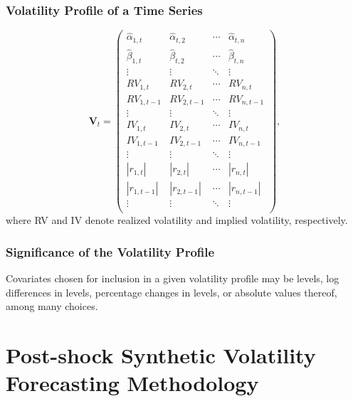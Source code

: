 \documentclass{beamer}
\theoremstyle{definition}
\begin{document}
\begin{frame}
\frametitle{Volatility Profile of a Time Series}
\fontsize{2}{7}

\begin{equation*}
    \textbf{V}_{t} = 
    \begin{pmatrix}
    \hat\alpha_{1,t} & \hat\alpha_{t,2}  & \cdots & \hat\alpha_{t,n}  \\
    \hat\beta_{1,t} & \hat\beta_{t,2}  & \cdots & \hat\beta_{t,n}  \\
    \vdots  & \vdots  & \ddots & \vdots  \\
    RV_{1,t} & RV_{2,t}  & \cdots & RV_{n,t}  \\
    RV_{1,t-1}  & RV_{2,t-1}  & \cdots & RV_{n,t-1}  \\
    \vdots  & \vdots  & \ddots & \vdots  \\
    IV_{1,t} & IV_{2,t} & \cdots & IV_{n,t} \\
    IV_{1,t-1}  & IV_{2,t-1}  & \cdots & IV_{n,t-1} \\
    \vdots  & \vdots  & \ddots & \vdots  \\
    |r_{1,t}| & |r_{2,t}| & \cdots & |r_{n,t}| \\
    |r_{1,t-1}|  & |r_{2,t-1}|  & \cdots & |r_{n,t-1}| \\
    \vdots  & \vdots  & \ddots & \vdots  \\
    \end{pmatrix},
    \end{equation*}
    where RV and IV denote realized volatility and implied volatility, respectively.  

\end{frame}

\begin{frame}
    \frametitle{Significance of the Volatility Profile}
    Covariates chosen for inclusion in a given volatility profile may be levels, log differences in levels, percentage changes in levels, or absolute values thereof, among many choices.
\end{frame}

\section{Post-shock Synthetic Volatility Forecasting Methodology}
\end{document}
